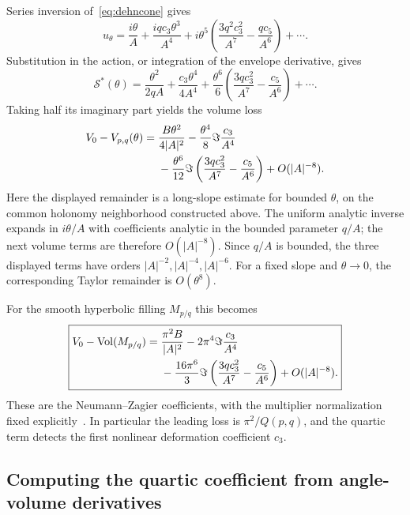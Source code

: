 Series inversion of~\eqref{eq:dehncone} gives
\begin{equation}
 u_\theta=\frac{i\theta}{A}
   +\frac{iqc_3\theta^3}{A^4}
   +i\theta^5\left(\frac{3q^2c_3^2}{A^7}
                         -\frac{qc_5}{A^6}\right)+\cdots.
 \label{eq:dehninversion}
\end{equation}
Substitution in the action, or integration of the envelope derivative,
gives
\begin{equation}
 \mathcal S^*(\theta)=\frac{\theta^2}{2qA}
  +\frac{c_3\theta^4}{4A^4}
  +\frac{\theta^6}{6}
       \left(\frac{3qc_3^2}{A^7}-\frac{c_5}{A^6}\right)+\cdots.
 \label{eq:dehncriticalseries}
\end{equation}
Taking half its imaginary part yields the volume loss
\begin{align}
 V_0-V_{p,q}(\theta)
 ={}&\frac{B\theta^2}{4|A|^2}
       -\frac{\theta^4}{8}\Im\frac{c_3}{A^4}\notag\\
    &-\frac{\theta^6}{12}
       \Im\left(\frac{3qc_3^2}{A^7}-\frac{c_5}{A^6}\right)
       +O(|A|^{-8}).
 \label{eq:dehnconeloss}
\end{align}
Here the displayed remainder is a long-slope estimate for bounded
$\theta$, on the common holonomy neighborhood constructed above.
The uniform analytic inverse expands in $i\theta/A$ with coefficients
analytic in the bounded parameter $q/A$; the next volume terms are
therefore $O(|A|^{-8})$. Since $q/A$ is bounded, the three displayed terms have
orders $|A|^{-2},|A|^{-4},|A|^{-6}$. For a fixed slope and
$\theta\to0$, the corresponding Taylor remainder is $O(\theta^8)$.

For the smooth hyperbolic filling $M_{p/q}$ this becomes
\begin{align}
 \boxed{\begin{aligned}
 V_0-\operatorname{Vol}(M_{p/q})
 ={}&\frac{\pi^2B}{|A|^2}
       -2\pi^4\Im\frac{c_3}{A^4}\\
    &-\frac{16\pi^6}{3}
       \Im\left(\frac{3qc_3^2}{A^7}-\frac{c_5}{A^6}\right)
       +O(|A|^{-8}).
 \end{aligned}}
 \label{eq:dehnsmoothloss}
\end{align}
These are the Neumann--Zagier coefficients, with the multiplier
normalization fixed explicitly~\cite[Section 6]{NeumannZagier}.
In particular the leading loss is $\pi^2/Q(p,q)$, and the quartic
term detects the first nonlinear deformation coefficient $c_3$.

\subsection{Computing the quartic coefficient from angle-volume derivatives}


